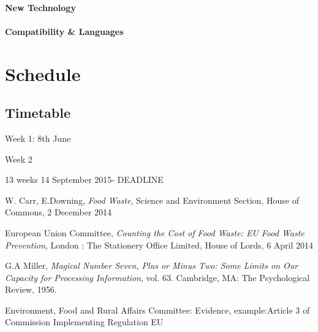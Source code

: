 \documentclass[a4paper, 11pt]{article}
\begin{document}
{\paragraph{New Technology}

\paragraph{Compatibility \& Languages}

\clearpage

\section{Schedule}
\subsection{Timetable}

Week 1: 8th June

Week 2


13 weeks
14 September 2015- DEADLINE

\clearpage


\begin{thebibliography}{15}

W. Carr, E.Downing, \emph{Food Waste}, Science and Environment Section, House of Commons, 2 December 2014
\vspace{\baselineskip}

European Union Committee, \emph{Counting the Cost of Food Waste: EU Food Waste Prevention}, London : The Stationery Office Limited, House of Lords, 6 April 2014
\vspace{\baselineskip}

G.A Miller, \emph{Magical Number Seven, Plus or Minus Two: Some Limits on Our Capacity for Processing Information}, vol. 63. Cambridge, MA: The Psychological Review, 1956.
\vspace{\baselineskip}

\vspace{\baselineskip}

Environment, Food and Rural Affairs Committee: Evidence,
example:Article 3 of Commission Implementing Regulation EU
\vspace{\baselineskip}


\end{thebibliography}}
\end{document}
